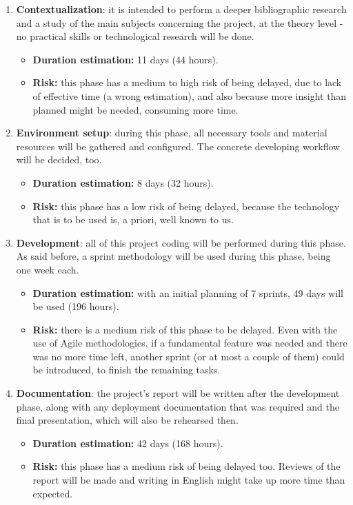 \begin{enumerate}
	\item \textbf{Contextualization}: it is intended to perform a deeper bibliographic research and a study of the main subjects concerning the project, at the theory level - no practical skills or technological research will be done.
	\begin{itemize}
		\item \textbf{Duration estimation:} 11 days (44 hours).
		\item \textbf{Risk:} this phase has a medium to high risk of being delayed, due to lack of effective time (a wrong estimation), and also because more insight than planned might be needed, consuming more time.
	\end{itemize}
	
	\item \textbf{Environment setup}: during this phase, all necessary tools and material resources will be gathered and configured. The concrete developing workflow will be decided, too.
		\begin{itemize}
			\item \textbf{Duration estimation:} 8 days (32 hours).
			\item \textbf{Risk:} this phase has a low risk of being delayed, because the technology that is to be used is, a priori, well known to us.
		\end{itemize}
		
	\item \textbf{Development}: all of this project coding will be performed during this phase. As said before, a sprint methodology will be used during this phase, being one week each.
		\begin{itemize}
			\item \textbf{Duration estimation:} with an initial planning of 7 sprints, 49 days will be used (196 hours).
			\item \textbf{Risk:} there is a medium risk of this phase to be delayed. Even with the use of Agile methodologies, if a fundamental feature was needed and there was no more time left, another sprint (or at most a couple of them) could be introduced, to finish the remaining tasks.
		\end{itemize}
		
	\item \textbf{Documentation}: the project’s report will be written after the development phase, along with any deployment documentation that was required and the final presentation, which will also be rehearsed then.
		\begin{itemize}
			\item \textbf{Duration estimation:} 42 days (168 hours).
			\item \textbf{Risk:} this phase has a medium risk of being delayed too. Reviews of the report will be made and writing in English might take up more time than expected.
		\end{itemize}
	
\end{enumerate}

